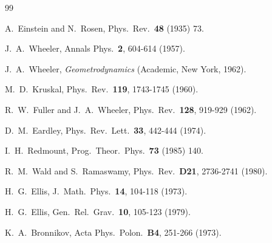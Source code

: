 \documentclass[showpacs,preprintnumbers,amsmath,amssymb,floatfix]{revtex4}
\begin{document}
\begin{thebibliography}{99}
  

  
  A.~Einstein and N.~Rosen,
  Phys.\ Rev.\  {\bf 48} (1935) 73.


  J.~A.~Wheeler,
  Annals Phys.\  {\bf 2}, 604-614 (1957).

  J.~A.~Wheeler, 
  {\it Geometrodynamics} (Academic, New York, 1962).

  M.~D.~Kruskal,
  Phys.\ Rev.\  {\bf 119}, 1743-1745 (1960).
  
  R.~W.~Fuller and J.~A.~Wheeler,
  Phys.\ Rev.\  {\bf 128}, 919-929 (1962).
  
  D.~M.~Eardley,
  Phys.\ Rev.\ Lett.\  {\bf 33}, 442-444 (1974).

  I.~H.~Redmount, 
  Prog.\ Theor.\ Phys.\ {\bf 73} (1985) 140.

  R.~M.~Wald and S.~Ramaswamy,
  Phys.\ Rev.\  {\bf D21}, 2736-2741 (1980).

  
  H.~G.~Ellis,
  J.\ Math.\ Phys.\  {\bf 14}, 104-118 (1973).

  H.~G.~Ellis,
  Gen.\ Rel.\ Grav.\  {\bf 10}, 105-123 (1979).

  K.~A.~Bronnikov,
  Acta Phys.\ Polon.\  {\bf B4}, 251-266 (1973).


\end{thebibliography}
\end{document}
